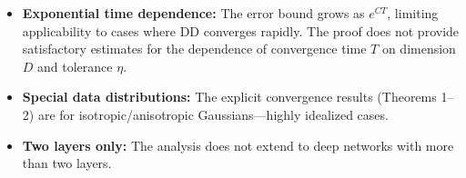 \documentclass[11pt]{article}
\begin{document}
\begin{itemize}
\item \textbf{Exponential time dependence:} The error bound grows as $e^{CT}$, limiting applicability to cases where DD converges rapidly. The proof does not provide satisfactory estimates for the dependence of convergence time $T$ on dimension $D$ and tolerance $\eta$.
\item \textbf{Special data distributions:} The explicit convergence results (Theorems 1--2) are for isotropic/anisotropic Gaussians—highly idealized cases.
\item \textbf{Two layers only:} The analysis does not extend to deep networks with more than two layers.
\end{itemize}





\end{document}
